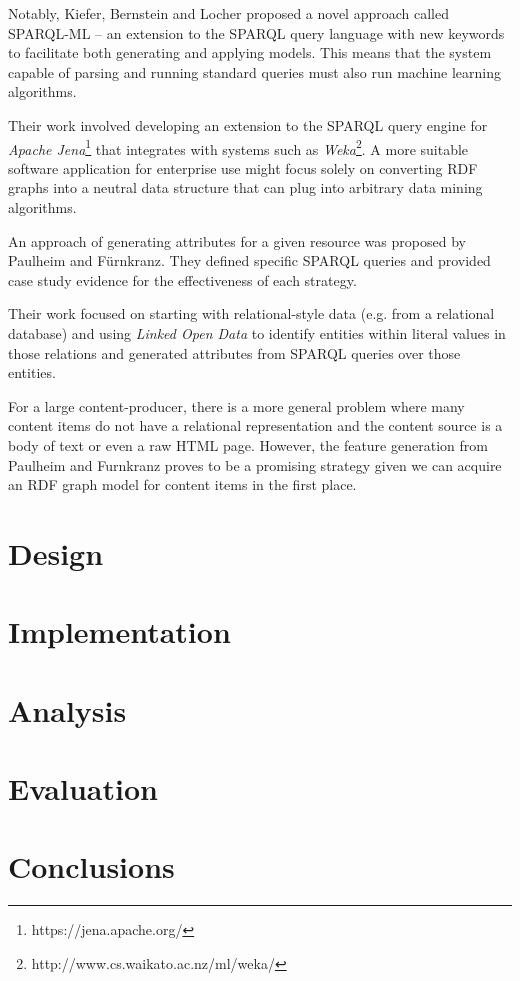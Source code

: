 \documentclass{sig-alternate-05-2015}
\begin{document}
Notably, Kiefer, Bernstein and Locher\cite{kiefer2008adding} proposed a novel
approach called SPARQL-ML -- an extension to the
SPARQL\cite{segaran2009programming} query language with new keywords to
facilitate both generating and applying models. This means that the system
capable of parsing and running standard queries must also run machine learning
algorithms.

Their work involved developing an extension to the SPARQL query
engine for \emph{Apache Jena}\footnote{https://jena.apache.org/} that integrates
with systems such as \emph{Weka}\footnote{http://www.cs.waikato.ac.nz/ml/weka/}.
A more suitable software application for enterprise use might focus solely on
converting RDF graphs into a neutral data structure that can plug into arbitrary
data mining algorithms.

An approach of generating attributes for a given resource was proposed by
Paulheim and F\"urnkranz\cite{paulheim2012unsupervised}. They defined specific
SPARQL queries and provided case study evidence for the effectiveness of
each strategy.

Their work focused on starting with relational-style data (e.g. from a
relational database) and using \emph{Linked Open Data} to identify entities
within literal values in those relations and generated attributes from
SPARQL queries over those entities.

For a large content-producer, there is a more general problem where many content
items do not have a relational representation and the content source is a body
of text or even a raw HTML page. However, the feature generation from Paulheim
and F\:urnkranz proves to be a promising strategy given we can acquire an RDF
graph model for content items in the first place.

\section{Design}

\section{Implementation}

\section{Analysis}

\section{Evaluation}

\section{Conclusions}

%
%
\end{document}
